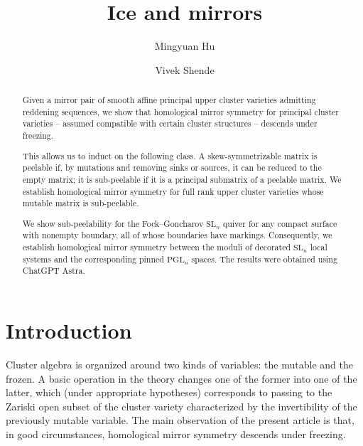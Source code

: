 \documentclass[12pt, letter]{amsart}
\title{Ice and mirrors}
\author{Mingyuan Hu}
\author{Vivek Shende}
\let\oldtableofcontents\tableofcontents
\renewcommand{\tableofcontents}{%
  \vspace*{-\linespacing}%
  \oldtableofcontents}
\theoremstyle{definition}
\numberwithin{equation}{section}
\begin{document}
\begin{abstract}
Given a mirror pair of smooth affine principal upper cluster varieties admitting reddening sequences, we show that homological mirror symmetry for principal cluster varieties -- assumed compatible with certain cluster structures -- descends under freezing.

This allows us to induct on the following class.  A skew-symmetrizable matrix is peelable if, by mutations and removing sinks or sources, it can be reduced to the empty matrix;  it is sub-peelable if it is a principal submatrix of a peelable matrix.  We establish  homological mirror symmetry for full rank upper cluster varieties whose mutable matrix is sub-peelable.

We show sub-peelability for the
Fock--Goncharov $\mathrm{SL}_n$  quiver for any compact surface with nonempty boundary, all of whose boundaries have markings.  Consequently, we establish  homological mirror symmetry between the moduli of decorated
$\mathrm{SL}_n$ local systems and the corresponding pinned
$\mathrm{PGL}_n$ spaces. 
The results were obtained using ChatGPT Astra.


\end{abstract}

\maketitle

\setlength{\parskip}{0pt}


\renewcommand\contentsname{\vspace*{-40pt}}
\tableofcontents



\thispagestyle{empty}


\setlength{\parskip}{.3\baselineskip plus 2pt}


\newpage




\section{Introduction}
\label{sec:intro}

Cluster algebra is organized around two kinds of variables: the mutable and the frozen.  A basic operation in the theory changes one of the former into one of the latter, which (under appropriate hypotheses) corresponds to passing to the Zariski open subset of the cluster variety characterized by the invertibility of the previously mutable variable.
The main observation of the present article is that, in good circumstances, homological mirror symmetry descends under  freezing.
\end{document}
